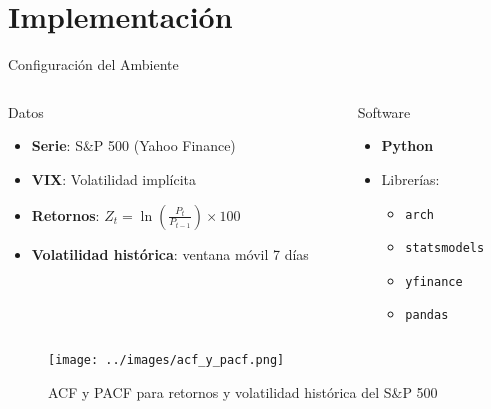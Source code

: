 \section{Implementación}

\begin{frame}{Configuración del Ambiente}
    \begin{columns}
        \begin{column}{0.6\textwidth}
            \begin{block}{Datos}
                \begin{itemize}
                    \item \textbf{Serie}: S\&P 500 (Yahoo Finance)
                    \item \textbf{VIX}: Volatilidad implícita
                    \item \textbf{Retornos}: $Z_t = \ln\left(\frac{P_t}{P_{t-1}}\right) \times 100$
                    \item \textbf{Volatilidad histórica}: ventana móvil 7 días
                \end{itemize}
            \end{block}
        \end{column}
        
        \begin{column}{0.4\textwidth}
            \begin{block}{Software}
                \begin{itemize}
                    \item \textbf{Python}
                    \item Librerías:
                    \begin{itemize}
                        \item \texttt{arch}
                        \item \texttt{statsmodels}
                        \item \texttt{yfinance}
                        \item \texttt{pandas}
                    \end{itemize}
                \end{itemize}
            \end{block}
        \end{column}
    \end{columns}
\end{frame}

\begin{frame}
    \begin{figure}
        \centering
        \texttt{[image: ../images/acf\_y\_pacf.png]}
        \caption{ACF y PACF para retornos y volatilidad histórica del S\&P 500}
    \end{figure}
\end{frame}

